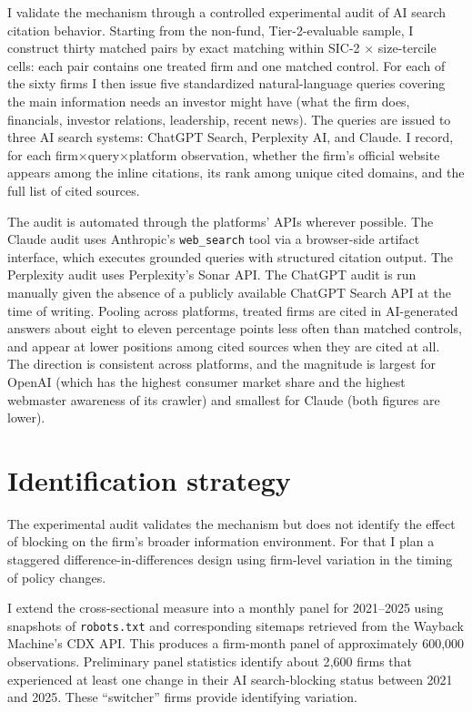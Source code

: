 \documentclass[11pt]{article}
\begin{document}
I validate the mechanism through a controlled experimental audit of AI
search citation behavior. Starting from the non-fund, Tier-2-evaluable
sample, I construct thirty matched pairs by exact matching within
SIC-2 $\times$ size-tercile cells: each pair contains one treated firm and
one matched control. For each of the sixty firms I then issue five
standardized natural-language queries covering the main information needs an
investor might have (what the firm does, financials, investor relations,
leadership, recent news). The queries are issued to three AI search
systems: ChatGPT Search, Perplexity AI, and Claude. I record, for each
firm$\times$query$\times$platform observation, whether the firm's official
website appears among the inline citations, its rank among unique cited
domains, and the full list of cited sources.

The audit is automated through the platforms' APIs wherever possible. The
Claude audit uses Anthropic's \texttt{web\_search} tool via a browser-side
artifact interface, which executes grounded queries with structured citation
output. The Perplexity audit uses Perplexity's Sonar API. The ChatGPT audit
is run manually given the absence of a publicly available ChatGPT Search API
at the time of writing. Pooling across platforms, treated firms are cited in
AI-generated answers about eight to eleven percentage points less often than
matched controls, and appear at lower positions among cited sources when
they are cited at all. The direction is consistent across platforms, and the
magnitude is largest for OpenAI (which has the highest consumer market
share and the highest webmaster awareness of its crawler) and smallest for
Claude (both figures are lower).

\section{Identification strategy}

The experimental audit validates the mechanism but does not identify the
effect of blocking on the firm's broader information environment. For that I
plan a staggered difference-in-differences design using firm-level variation
in the timing of policy changes.

I extend the cross-sectional measure into a monthly panel for 2021--2025
using snapshots of \texttt{robots.txt} and corresponding sitemaps retrieved
from the Wayback Machine's CDX API. This produces a firm-month panel of
approximately 600{,}000 observations. Preliminary panel statistics identify
about 2{,}600 firms that experienced at least one change in their AI
search-blocking status between 2021 and 2025. These ``switcher'' firms
provide identifying variation.
\end{document}
